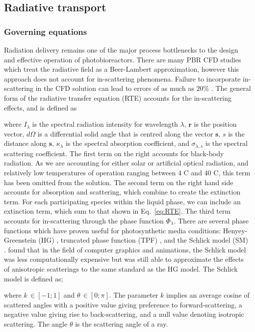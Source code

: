 \subsection{Radiative transport}
\subsubsection{Governing equations}
Radiation delivery remains one of the major process bottlenecks to the design and effective operation of photobioreactors. There are many PBR CFD studies which treat the radiative field as a Beer-Lambert approximation, however this approach does not account for in-scattering phenomena. Failure to incorporate in-scattering in the CFD solution can lead to errors of as much as 20\% \cite{Berberoglu2007}. The general form of the radiative transfer equation (RTE) accounts for the in-scattering effects, and is defined as



\noindent where $I_\lambda$ is the spectral radiation intensity for wavelength $\lambda$, $\mathbf{r}$ is the position vector, $d\Omega$ is a differential solid angle that is centred along the vector $\mathbf{s}$, $s$ is the distance along $\mathbf{s}$, $\kappa_\lambda$ is the spectral absorption coefficient, and $\sigma_{\lambda,s}$ is the spectral scattering coefficient. The first term on the right accounts for black-body radiation. As we are accounting for either solar or artificial optical radiation, and relatively low temperatures of operation ranging between 4 \degree C and 40 \degree C, this term has been omitted from the solution. The second term on the right hand side accounts for absorption and scattering,  which combine to create the extinction term. For each participating species within the liquid phase, we can include an extinction term, which sum to that shown in Eq.\ \ref{eq:RTE}. The third term accounts for in-scattering through the phase function $\Phi_\lambda$. 
\skippingparagraph
There are several phase functions which have proven useful for photosynthetic media conditions: Henyey-Greenstein (HG) \cite{Kong2014}, truncated phase function (TPF) \cite{Berberoglu2007}, and the Schlick model (SM) \cite{Jarosz2008}. \cite{Jarosz2008} found that in the field of computer graphics and animations, the Schlick model was less computationally expensive but was still able to approximate the effects of anisotropic scatterings to the same standard as the HG model. The Schlick model is defined as;


%
where $k \, \in [-1;1]$ and $\theta \, \in [0;\pi]$. The parameter $k$ implies an average cosine of scattered angles with a positive value giving preference to forward-scattering, a negative value giving rise to back-scattering, and a null value denoting isotropic scattering. The angle $\theta$ is the scattering angle of a ray.
\skippingparagraph

